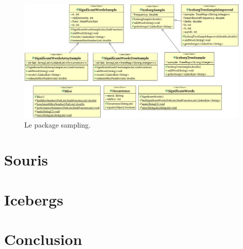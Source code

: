 \documentclass[12pt,a4paper,titlepage]{article}
\begin{document}
\begin{figure}
	\label{fig:samplingPackage}
	\centering
	\includegraphics[scale=0.55, angle=90]{../Java Workspace/Test Hash/samplingPackage.png}
	\caption{Le package sampling.}
\end{figure}



\newpage
\section{Souris}


\newpage
\section{Icebergs}

\newpage
\section*{Conclusion}



 
\end{document}
